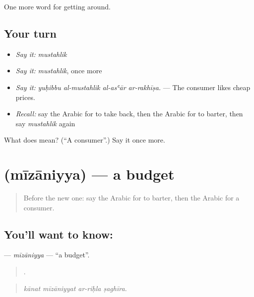 \begin{grammarlens}[title={What you've built}]
One more word for getting around.
\end{grammarlens}

\subsection*{Your turn}
\begin{itemize}
\raggedright
  \item \emph{Say it:} \emph{mustahlik}
  \item \emph{Say it:} \emph{mustahlik}, once more
  \item \emph{Say it:} \emph{yuḥibbu al-mustahlik al-asʿār ar-rakhīṣa.} — The consumer likes cheap prices.
  \item \emph{Recall:} say the Arabic for to take back, then the Arabic for to barter, then say \emph{mustahlik} again
\end{itemize}

\begin{tcolorbox}[breakable,colback=teal!4,colframe=teal!35!black,title={Before you move on}]
What does  mean? (\textquotedblleft{}A consumer\textquotedblright{}.) Say it once more.
\end{tcolorbox}
\section[\texorpdfstring{\ar{ميزانية} (mīzāniyya)}{ميزانية (mīzāniyya)}]{ (mīzāniyya) — a budget}

\label{lesson:AR-C459-mizaniyya}



\begin{quote}
Before the new one: say the Arabic for to barter, then the Arabic for a consumer.
\end{quote}

\subsection*{You'll want to know: }
\textbf{} — \emph{mīzāniyya} — \textquotedblleft{}a budget\textquotedblright{}.

\begin{quote}
   .
\end{quote}

\begin{quote}
\emph{kānat mīzāniyyat ar-riḥla ṣaghīra.}
\end{quote}

